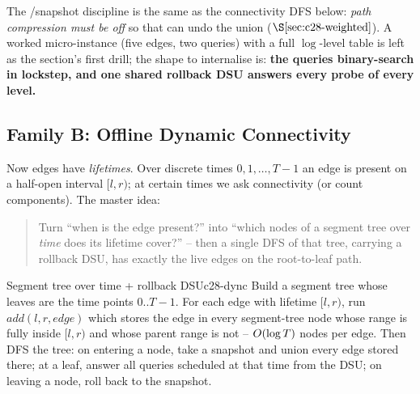 The /snapshot discipline is the same as the connectivity DFS below:
\emph{path compression must be off} so that  can undo the union
(\(\secref{c28-weighted}\)).  A worked micro-instance (five edges, two queries)
with a full \(\log\)-level table is left as the section's first drill; the shape
to internalise is: \textbf{the queries binary-search in lockstep, and one shared
rollback DSU answers every probe of every level.}

\subsection{Family B: Offline Dynamic Connectivity}

Now edges have \emph{lifetimes}.  Over discrete times \(0,1,\dots,T-1\) an edge
is present on a half-open interval \([l,r)\); at certain times we ask
connectivity (or count components).  The master idea:

\begin{quote}\small
Turn ``when is the edge present?'' into ``which nodes of a segment tree over
\emph{time} does its lifetime cover?'' -- then a single DFS of that tree,
carrying a rollback DSU, has exactly the live edges on the root-to-leaf path.
\end{quote}

\begin{definition}{Segment tree over time + rollback DSU}{c28-dync}
Build a segment tree whose leaves are the time points \(0..T-1\).  For each edge
with lifetime \([l,r)\), run \(\mathit{add}(l,r,\mathit{edge})\) which stores the
edge in every segment-tree node whose range is fully inside \([l,r)\) and whose
parent range is not -- \(O(\log T)\) nodes per edge.  Then DFS the tree:
on entering a node, take a snapshot and union every edge stored there; at a
leaf, answer all queries scheduled at that time from the DSU; on leaving a node,
roll back to the snapshot.
\end{definition}

